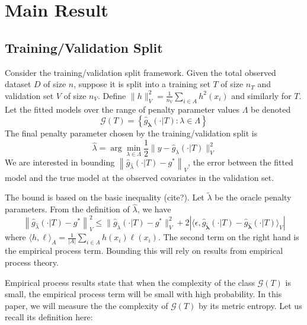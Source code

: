 \documentclass[12pt]{article}
\begin{document}
\section{Main Result} \label{sec:main_results}

\subsection{Training/Validation Split}

Consider the training/validation split framework. Given the total observed dataset $D$ of size $n$, suppose it is split into a training set $T$ of size $n_T$ and validation set $V$ of size $n_V$. Define $\| h \|_V^2 = \frac{1}{n_V}\sum_{i\in A} h^2(x_i)$ and similarly for $T$. Let the fitted models over the range of penalty parameter values $\Lambda$ be denoted
\begin{equation}
\label{function_class_GT}
\mathcal{G}(T) = \left \{ \hat{g}_{\boldsymbol \lambda}(\cdot | T) : \lambda \in \Lambda  \right \}
\end{equation}
The final penalty parameter chosen by the training/validation split is
\begin{equation}
\label{cv_lambda}
\hat{\lambda} = \arg\min_{\lambda\in\Lambda} \frac{1}{2}  \| y-\hat{g}_{\lambda}(\cdot | T) \|_{V}^{2}
\end{equation} 
We are interested in bounding $\left \|\hat{g}_{\hat{\lambda} }(\cdot | T) - g^* \right \|_V$, the error between the fitted model and the true model at the observed covariates in the validation set. 

The bound is based on the basic inequality (cite?). Let $\tilde{\lambda}$ be the oracle penalty parameters. From the definition of $\hat{\lambda}$, we have
\begin{equation}
\label{basic_ineq}
\left \|\hat{g}_{\hat{\lambda} }(\cdot | T) - g^* \right \|_V^2
\le
\| \hat{g}_{\tilde{\lambda}}(\cdot | T) - g^*\|_V^2 + 
2 \left | \langle \epsilon, \hat{g}_{\tilde{\boldsymbol \lambda}}(\cdot | T) - \hat{g}_{\hat{\boldsymbol \lambda}}(\cdot | T) \rangle_V \right |
\end{equation}
where $\langle h, \ell \rangle_A = \frac{1}{|A|}\sum_{i\in A} h(x_i) \ell(x_i)$. The second term on the right hand is the empirical process term. Bounding this will rely on results from empirical process theory.

Empirical process results state that when the complexity of the class $\mathcal{G}(T)$ is small, the empirical process term will be small with high probability. In this paper, we will measure the the complexity of $\mathcal{G}(T)$ by its metric entropy. Let us recall its definition here:
\end{document}
